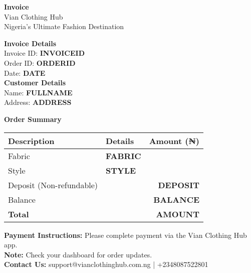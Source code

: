 \documentclass[a4paper,12pt]{article}
\begin{document}
\begin{center}
    {\color{vianpurple}\textbf{\LARGE Invoice}} \\
    \vspace{0.5cm}
    Vian Clothing Hub \\
    Nigeria's Ultimate Fashion Destination \\
    \vspace{0.5cm}
\end{center}

\begin{flushleft}
    \textbf{Invoice Details} \\
    Invoice ID: \textbf{INVOICEID} \\
    Order ID: \textbf{ORDERID} \\
    Date: \textbf{DATE} \\
    \vspace{0.5cm}
    \textbf{Customer Details} \\
    Name: \textbf{FULLNAME} \\
    Address: \textbf{ADDRESS} \\
\end{flushleft}

\begin{center}
    \vspace{0.5cm}
    \textbf{Order Summary}
    \begin{tabular}{llr}
        \toprule
        \textbf{Description} & \textbf{Details} & \textbf{Amount (₦)} \\
        \midrule
        Fabric & \textbf{FABRIC} & \\
        Style & \textbf{STYLE} & \\
        \midrule
        Deposit (Non-refundable) & & \textbf{DEPOSIT} \\
        Balance & & \textbf{BALANCE} \\
        \midrule
        \textbf{Total} & & \textbf{AMOUNT} \\
        \bottomrule
    \end{tabular}
\end{center}

\vspace{1cm}

\begin{flushleft}
    \textbf{Payment Instructions:} Please complete payment via the Vian Clothing Hub app. \\
    \textbf{Note:} Check your dashboard for order updates. \\
    \textbf{Contact Us:} support@vianclothinghub.com.ng | +2348087522801
\end{flushleft}
\end{document}
